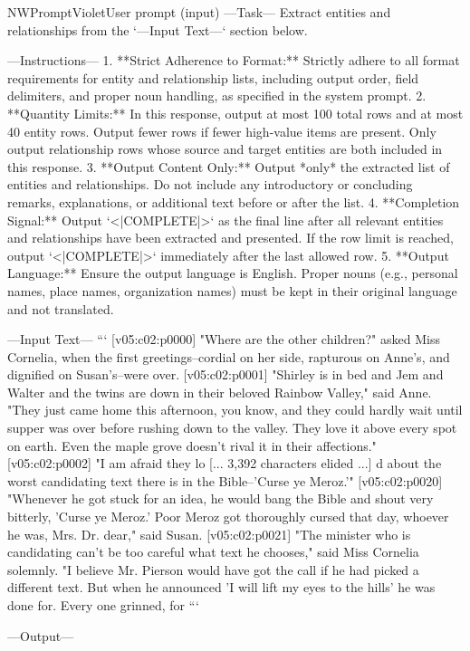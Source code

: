\begin{nwprompt}{NWPromptViolet}{User prompt (input)}
---Task---
Extract entities and relationships from the `---Input Text---` section below.

---Instructions---
1. **Strict Adherence to Format:** Strictly adhere to all format requirements for entity and relationship lists, including output order, field delimiters, and proper noun handling, as specified in the system prompt.
2. **Quantity Limits:** In this response, output at most 100 total rows and at most 40 entity rows. Output fewer rows if fewer high-value items are present. Only output relationship rows whose source and target entities are both included in this response.
3. **Output Content Only:** Output *only* the extracted list of entities and relationships. Do not include any introductory or concluding remarks, explanations, or additional text before or after the list.
4. **Completion Signal:** Output `<|COMPLETE|>` as the final line after all relevant entities and relationships have been extracted and presented. If the row limit is reached, output `<|COMPLETE|>` immediately after the last allowed row.
5. **Output Language:** Ensure the output language is English. Proper nouns (e.g., personal names, place names, organization names) must be kept in their original language and not translated.

---Input Text---
```
[v05:c02:p0000] "Where are the other children?" asked Miss Cornelia, when the first greetings--cordial on her side, rapturous on Anne's, and dignified on Susan's--were over.
[v05:c02:p0001] "Shirley is in bed and Jem and Walter and the twins are down in their beloved Rainbow Valley," said Anne. "They just came home this afternoon, you know, and they could hardly wait until supper was over before rushing down to the valley. They love it above every spot on earth. Even the maple grove doesn't rival it in their affections."
[v05:c02:p0002] "I am afraid they lo
[... 3,392 characters elided ...]
d about the worst candidating text there is in the Bible--'Curse ye Meroz.'"
[v05:c02:p0020] "Whenever he got stuck for an idea, he would bang the Bible and shout very bitterly, 'Curse ye Meroz.' Poor Meroz got thoroughly cursed that day, whoever he was, Mrs. Dr. dear," said Susan.
[v05:c02:p0021] "The minister who is candidating can't be too careful what text he chooses," said Miss Cornelia solemnly. "I believe Mr. Pierson would have got the call if he had picked a different text. But when he announced 'I will lift my eyes to the hills' he was done for. Every one grinned, for
```

---Output---
\end{nwprompt}

